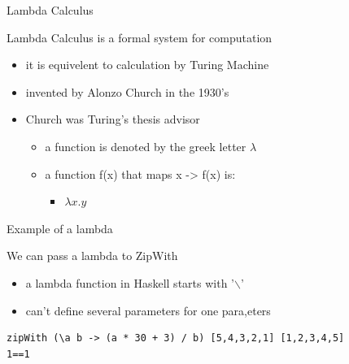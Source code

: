 \documentclass[presetation]{beamer}
\begin{document}
\begin{frame}[label={sec:org03eeb7c}]{Lambda Calculus}
\begin{block}{Lambda Calculus is a formal system for computation}
\begin{itemize}
\item it is equivelent to calculation by Turing Machine
\item invented by Alonzo Church in the 1930's
\item Church was Turing's thesis advisor
\begin{itemize}
\item a function is denoted by the greek letter \(\lambda\)
\item a function f(x) that maps x -> f(x) is:
\begin{itemize}
\item \(\lambda x.y\)
\end{itemize}
\end{itemize}
\end{itemize}
\end{block}
\end{frame}
\begin{frame}[fragile,label={sec:org73ab9f1}]{Example of a lambda}
 \begin{block}{We can pass a lambda to ZipWith}
\begin{itemize}
\item a lambda function in Haskell starts with '$\backslash$'
\item can't define several parameters for one para,eters
\end{itemize}
\begin{verbatim}
zipWith (\a b -> (a * 30 + 3) / b) [5,4,3,2,1] [1,2,3,4,5]
1==1
\end{verbatim}
\end{block}
\end{frame}
\end{document}
